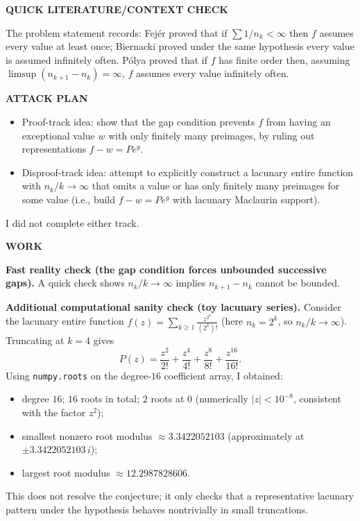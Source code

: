 \medskip
\noindent\textbf{QUICK LITERATURE/CONTEXT CHECK}

The problem statement records: Fej\'er proved that if $\sum 1/n_k<\infty$ then $f$ assumes every value at least once; Biernacki proved under the same hypothesis every value is assumed infinitely often. P\'olya proved that if $f$ has finite order then, assuming $\limsup (n_{k+1}-n_k)=\infty$, $f$ assumes every value infinitely often.

\medskip
\noindent\textbf{ATTACK PLAN}

\begin{itemize}
\item Proof-track idea: show that the gap condition prevents $f$ from having an exceptional value $w$ with only finitely many preimages, by ruling out representations $f-w = P e^g$.
\item Disproof-track idea: attempt to explicitly construct a lacunary entire function with $n_k/k\to\infty$ that omits a value or has only finitely many preimages for some value (i.e., build $f-w=P e^g$ with lacunary Maclaurin support).
\end{itemize}
I did not complete either track.

\medskip
\noindent\textbf{WORK}

\noindent\textbf{Fast reality check (the gap condition forces unbounded successive gaps).}
A quick check shows $n_k/k\to\infty$ implies $n_{k+1}-n_k$ cannot be bounded.

\noindent\textbf{Additional computational sanity check (toy lacunary series).}
Consider the lacunary entire function $f(z)=\sum_{k\ge 1} \frac{z^{2^k}}{(2^k)!}$ (here $n_k=2^k$, so $n_k/k\to\infty$). Truncating at $k=4$ gives
\[
P(z)=\frac{z^2}{2!}+\frac{z^4}{4!}+\frac{z^8}{8!}+\frac{z^{16}}{16!}.
\]
Using \texttt{numpy.roots} on the degree-$16$ coefficient array, I obtained:
\begin{itemize}
\item degree $16$; $16$ roots in total; $2$ roots at $0$ (numerically $|z|<10^{-8}$, consistent with the factor $z^2$);
\item smallest nonzero root modulus $\approx 3.3422052103$ (approximately at $\pm 3.3422052103\, i$);
\item largest root modulus $\approx 12.2987828606$.
\end{itemize}
This does not resolve the conjecture; it only checks that a representative lacunary pattern under the hypothesis behaves nontrivially in small truncations.



